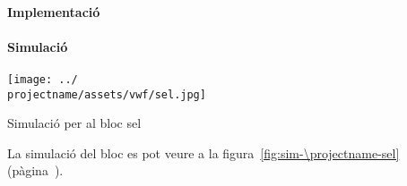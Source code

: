 \paragraph{Implementació}





\paragraph{Simulació}

\begin{contendfig}
  \begin{center}
    \texttt{[image: ../\\projectname/assets/vwf/sel.jpg]}
  \end{center}
  \caption{\label{fig:sim-\projectname-sel} Simulació per al bloc \textsf{sel}}
\end{contendfig}

La simulació del bloc es pot veure a la figura~\ref{fig:sim-\projectname-sel} (pàgina~\pageref{fig:sim-\projectname-sel}).


\vspace{1cm}
